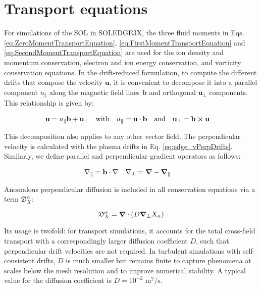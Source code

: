 \section{Transport equations}
\label{sec:S3X_TransportEquations}

For simulations of the SOL in SOLEDGE3X, the three fluid moments in Eqs. \ref{eq:ZeroMomentTransportEquation}, \ref{eq:FirstMomentTransportEquation} and \ref{eq:SecondMomentTransportEquation} are used for the ion density and momentum conservation, electron and ion energy conservation, and vorticity conservation equations. In the drift-reduced formulation, to compute the different drifts that compose the velocity $\mathbf{u}$, it is convenient to decompose it into a parallel component $u_\parallel$ along the magnetic field lines $\mathbf{b}$ and orthogonal $\mathbf{u}_\perp$ components. This relationship is given by:

\begin{align}
	\label{eq:RelationPerpParallelVelocity}
	\mathbf{u} &= u_\parallel \mathbf{b} + \mathbf{u}_\perp & \text{with} \quad u_\parallel = \mathbf{u}\cdot\mathbf{b} \quad &\text{and} \quad \mathbf{u}_\perp = \mathbf{b}\cross\mathbf{u}
\end{align}

This decomposition also applies to any other vector field. The perpendicular velocity is calculated with the plasma drifts in Eq. \ref{eq:edge_vPerpDrifts}. Similarly, we define parallel and perpendicular gradient operators as follows:

\begin{align}
	\nabla_\parallel &= \mathbf{b}\cdot\nabla & \nabla_\perp &= \grad - \grad_\parallel
\end{align}

Anomalous perpendicular diffusion is included in all conservation equations via a term $\mathfrak{D}_X^\alpha$:

\begin{equation}
	\mathfrak{D}_X^\alpha = \grad\cdot\left(D\grad_\perp X_\alpha\right)
\end{equation}

Its usage is twofold: for transport simulations, it accounts for the total cross-field transport with a correspondingly larger diffusion coefficient $D$, such that perpendicular drift velocities are not required. In turbulent simulations with self-consistent drifts, $D$ is much smaller but remains finite to capture phenomena at scales below the mesh resolution and to improve numerical stability. A typical value for the diffusion coefficient is $D = 10^{-2}$ m$^2$/s. \\

